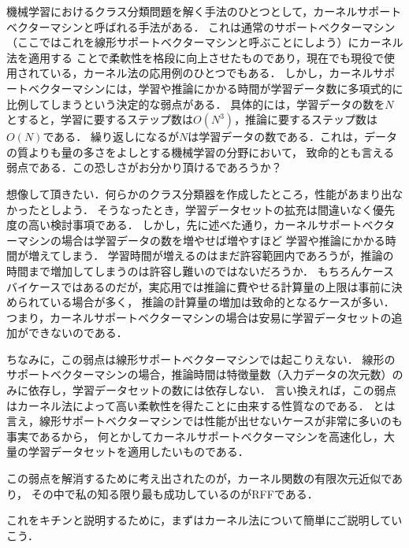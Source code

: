 %

機械学習におけるクラス分類問題を解く手法のひとつとして，カーネルサポートベクターマシンと呼ばれる手法がある．
これは通常のサポートベクターマシン（ここではこれを線形サポートベクターマシンと呼ぶことにしよう）にカーネル法を適用する
ことで柔軟性を格段に向上させたものであり，現在でも現役で使用されている，カーネル法の応用例のひとつでもある．
しかし，カーネルサポートベクターマシンには，学習や推論にかかる時間が学習データ数に多項式的に比例してしまうという決定的な弱点がある．
具体的には，学習データの数を$N$とすると，学習に要するステップ数は$O(N^3)$，推論に要するステップ数は$O(N)$である．
繰り返しになるが$N$は学習データの数である．これは，データの質よりも量の多さをよしとする機械学習の分野において，
致命的とも言える弱点である．この恐しさがお分かり頂けるであろうか？

想像して頂きたい．何らかのクラス分類器を作成したところ，性能があまり出なかったとしよう．
そうなったとき，学習データセットの拡充は間違いなく優先度の高い検討事項である．
しかし，先に述べた通り，カーネルサポートベクターマシンの場合は学習データの数を増やせば増やすほど
学習や推論にかかる時間が増えてしまう．
学習時間が増えるのはまだ許容範囲内であろうが，推論の時間まで増加してしまうのは許容し難いのではないだろうか．
もちろんケースバイケースではあるのだが，実応用では推論に費やせる計算量の上限は事前に決められている場合が多く，
推論の計算量の増加は致命的となるケースが多い．
つまり，カーネルサポートベクターマシンの場合は安易に学習データセットの追加ができないのである．

ちなみに，この弱点は線形サポートベクターマシンでは起こりえない．
線形のサポートベクターマシンの場合，推論時間は特徴量数（入力データの次元数）のみに依存し，学習データセットの数には依存しない．
言い換えれば，この弱点はカーネル法によって高い柔軟性を得たことに由来する性質なのである．
とは言え，線形サポートベクターマシンでは性能が出せないケースが非常に多いのも事実であるから，
何とかしてカーネルサポートベクターマシンを高速化し，大量の学習データセットを適用したいものである．

この弱点を解消するために考え出されたのが，カーネル関数の有限次元近似であり，
その中で私の知る限り最も成功しているのがRFFである．

これをキチンと説明するために，まずはカーネル法について簡単にご説明していこう．

